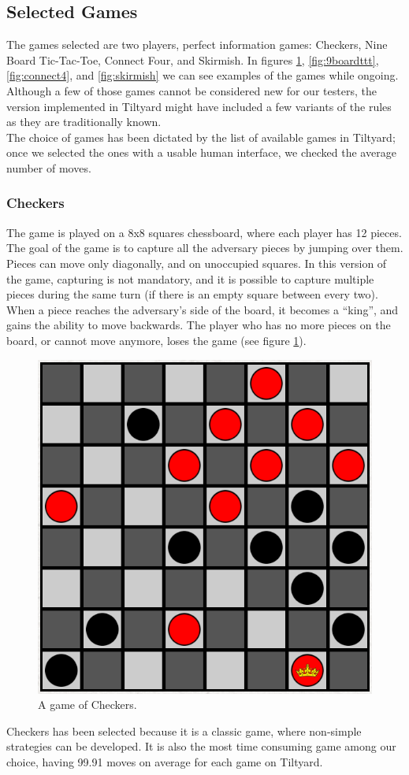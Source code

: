 \subsection{Selected Games}\label{subsec:rulesgames}
The games selected are two players, perfect information games: Checkers, Nine Board Tic-Tac-Toe, Connect Four, and Skirmish. In figures \ref{fig:checkers}, \ref{fig:9boardttt}, \ref{fig:connect4}, and \ref{fig:skirmish} we can see examples of the games while ongoing. Although a few of those games cannot be considered new for our testers, the version implemented in Tiltyard might have included a few variants of the rules as they are traditionally known.\\
The choice of games has been dictated by the list of available games in Tiltyard; once we selected the ones with a usable human interface, we checked the average number of moves.
\subsubsection*{Checkers}
The game is played on a 8x8 squares chessboard, where each player has 12 pieces. The goal of the game is to capture all the adversary pieces by jumping over them. Pieces can move only diagonally, and on unoccupied squares. In this version of the game, capturing is not mandatory, and it is possible to capture multiple pieces during the same turn (if there is an empty square between every two). When a piece reaches the adversary's side of the board, it becomes a “king”, and gains the ability to move backwards. The player who has no more pieces on the board, or cannot move anymore, loses the game (see figure \ref{fig:checkers}).
\begin{figure}[H]
\centering
	\includegraphics[scale=0.35]{figure/checkers}
    \caption{A game of Checkers.}
    \label{fig:checkers}
\end{figure}
Checkers has been selected because it is a classic game, where non-simple strategies can be developed. It is also the most time consuming game among our choice, having 99.91 moves on average for each game on Tiltyard\cite{checkers}.

